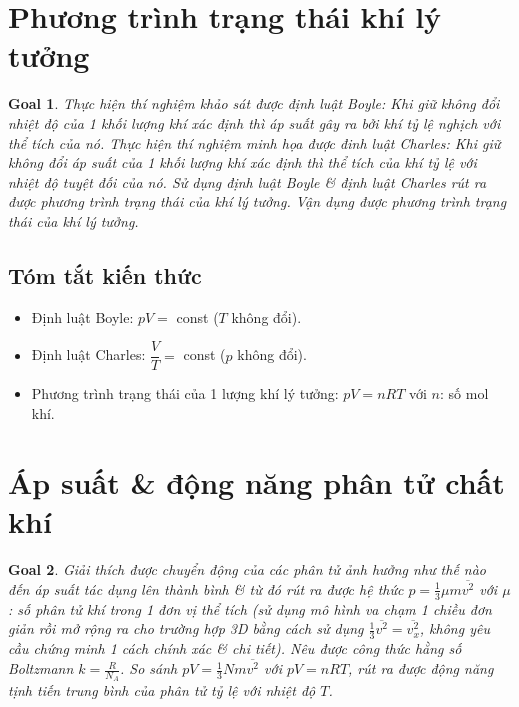 \documentclass{article}
\newtheorem{goal}{Goal}
\begin{document}

\section{Phương trình trạng thái khí lý tưởng}

\begin{goal}
	Thực hiện thí nghiệm khảo sát được định luật Boyle: Khi giữ không đổi nhiệt độ của 1 khối lượng khí xác định thì áp suất gây ra bởi khí tỷ lệ nghịch với thể tích của nó. Thực hiện thí nghiệm minh họa được đinh luật Charles: Khi giữ không đổi áp suất của 1 khối lượng khí xác định thì thể tích của khí tỷ lệ với nhiệt độ tuyệt đối của nó. Sử dụng định luật Boyle \& định luật Charles rút ra được phương trình trạng thái của khí lý tưởng. Vận dụng được phương trình trạng thái của khí lý tưởng.
\end{goal}

\subsection{Tóm tắt kiến thức}

\begin{itemize}
	\item Định luật Boyle: $pV =$ const ($T$ không đổi).
	\item Định luật Charles: $\dfrac{V}{T} =$ const ($p$ không đổi).
	\item Phương trình trạng thái của 1 lượng khí lý tưởng: $pV = nRT$ với $n$: số mol khí.
\end{itemize}


\section{Áp suất \& động năng phân tử chất khí}

\begin{goal}
	Giải thích được chuyển động của các phân tử ảnh hưởng như thế nào đến áp suất tác dụng lên thành bình \& từ đó rút ra được hệ thức $p = \frac{1}{3}\mu m\overline{v^2}$ với $\mu$: số phân tử khí trong 1 đơn vị thể tích (sử dụng mô hình va chạm 1 chiều đơn giản rồi mở rộng ra cho trường hợp 3D bằng cách sử dụng $\frac{1}{3}\overline{v^2} = \overline{v_x^2}$, không yêu cầu chứng minh 1 cách chính xác \& chi tiết). Nêu được {\it công thức hằng số Boltzmann} $k = \frac{R}{N_A}$. So sánh $pV = \frac{1}{3}Nm\overline{v^2}$ với $pV = nRT$, rút ra được động năng tịnh tiến trung bình của phân tử tỷ lệ với nhiệt độ $T$.
\end{goal}
\end{document}
